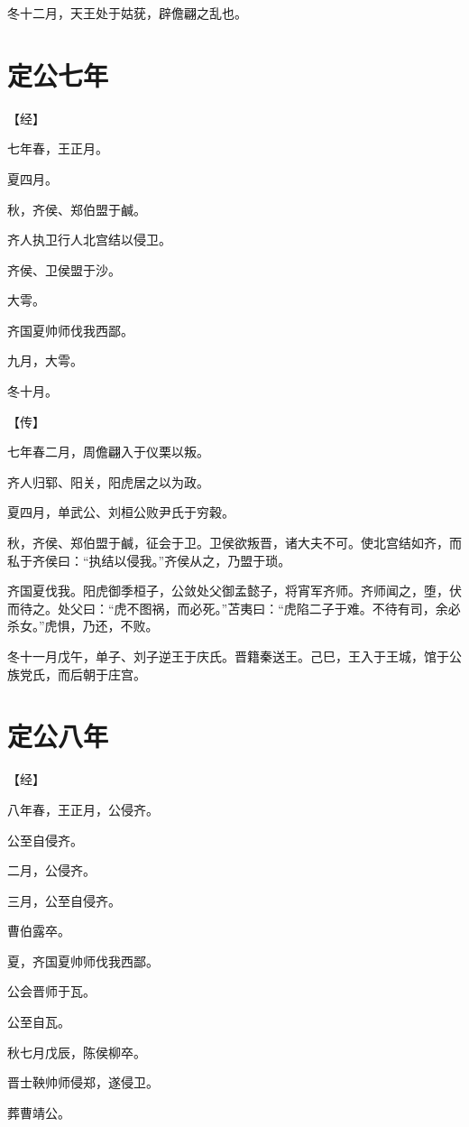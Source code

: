 \documentclass[a4paper,12pt,UTF8,twoside]{ctexbook}
\begin{document}
冬十二月，天王处于姑莸，辟儋翩之乱也。

\chapter{定公七年}



【经】

七年春，王正月。

夏四月。

秋，齐侯、郑伯盟于鹹。

齐人执卫行人北宫结以侵卫。

齐侯、卫侯盟于沙。

大雩。

齐国夏帅师伐我西鄙。

九月，大雩。

冬十月。

【传】

七年春二月，周儋翩入于仪栗以叛。

齐人归郓、阳关，阳虎居之以为政。

夏四月，单武公、刘桓公败尹氏于穷穀。

秋，齐侯、郑伯盟于鹹，征会于卫。卫侯欲叛晋，诸大夫不可。使北宫结如齐，而私于齐侯曰：“执结以侵我。”齐侯从之，乃盟于琐。

齐国夏伐我。阳虎御季桓子，公敛处父御孟懿子，将宵军齐师。齐师闻之，堕，伏而待之。处父曰：“虎不图祸，而必死。”苫夷曰：“虎陷二子于难。不待有司，余必杀女。”虎惧，乃还，不败。

冬十一月戊午，单子、刘子逆王于庆氏。晋籍秦送王。己巳，王入于王城，馆于公族党氏，而后朝于庄宫。


\chapter{定公八年}




【经】

八年春，王正月，公侵齐。

公至自侵齐。

二月，公侵齐。

三月，公至自侵齐。

曹伯露卒。

夏，齐国夏帅师伐我西鄙。

公会晋师于瓦。

公至自瓦。

秋七月戊辰，陈侯柳卒。

晋士鞅帅师侵郑，遂侵卫。

葬曹靖公。
\end{document}
